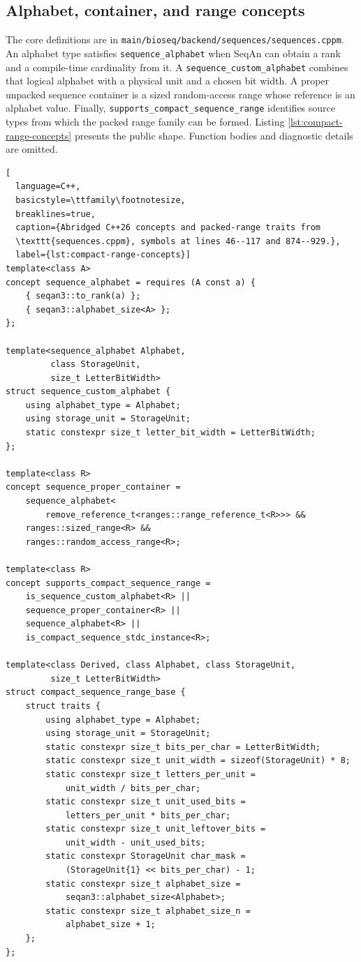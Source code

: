 \subsection{Alphabet, container, and range concepts}

The core definitions are in
\texttt{main/bioseq/backend/sequences/sequences.cppm}.  An alphabet type
satisfies \texttt{sequence\_alphabet} when SeqAn can obtain a rank and a
compile-time cardinality from it.  A \texttt{sequence\_custom\_alphabet}
combines that logical alphabet with a physical unit and a chosen bit width.
A proper unpacked sequence container is a sized random-access range whose
reference is an alphabet value.  Finally,
\texttt{supports\_compact\_sequence\_range} identifies source types from which
the packed range family can be formed.  Listing
\ref{lst:compact-range-concepts} presents the public shape.  Function bodies
and diagnostic details are omitted.

\begin{lstlisting}[
  language=C++,
  basicstyle=\ttfamily\footnotesize,
  breaklines=true,
  caption={Abridged C++26 concepts and packed-range traits from
  \texttt{sequences.cppm}, symbols at lines 46--117 and 874--929.},
  label={lst:compact-range-concepts}]
template<class A>
concept sequence_alphabet = requires (A const a) {
    { seqan3::to_rank(a) };
    { seqan3::alphabet_size<A> };
};

template<sequence_alphabet Alphabet,
         class StorageUnit,
         size_t LetterBitWidth>
struct sequence_custom_alphabet {
    using alphabet_type = Alphabet;
    using storage_unit = StorageUnit;
    static constexpr size_t letter_bit_width = LetterBitWidth;
};

template<class R>
concept sequence_proper_container =
    sequence_alphabet<
        remove_reference_t<ranges::range_reference_t<R>>> &&
    ranges::sized_range<R> &&
    ranges::random_access_range<R>;

template<class R>
concept supports_compact_sequence_range =
    is_sequence_custom_alphabet<R> ||
    sequence_proper_container<R> ||
    sequence_alphabet<R> ||
    is_compact_sequence_stdc_instance<R>;

template<class Derived, class Alphabet, class StorageUnit,
         size_t LetterBitWidth>
struct compact_sequence_range_base {
    struct traits {
        using alphabet_type = Alphabet;
        using storage_unit = StorageUnit;
        static constexpr size_t bits_per_char = LetterBitWidth;
        static constexpr size_t unit_width = sizeof(StorageUnit) * 8;
        static constexpr size_t letters_per_unit =
            unit_width / bits_per_char;
        static constexpr size_t unit_used_bits =
            letters_per_unit * bits_per_char;
        static constexpr size_t unit_leftover_bits =
            unit_width - unit_used_bits;
        static constexpr StorageUnit char_mask =
            (StorageUnit{1} << bits_per_char) - 1;
        static constexpr size_t alphabet_size =
            seqan3::alphabet_size<Alphabet>;
        static constexpr size_t alphabet_size_n =
            alphabet_size + 1;
    };
};
\end{lstlisting}

